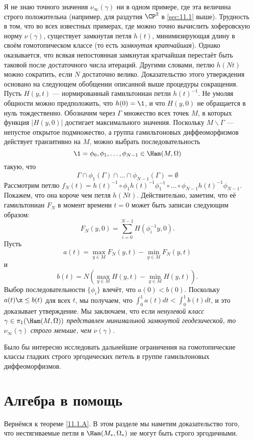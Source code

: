 Я не знаю точного значения $\nu_\infty (\gamma)$ ни в одном примере, где эта величина строго положительна (например, для раздутия $\CP^2$ в \ref{sec:11.1} выше).
Трудность в том, что во всех известных примерах, где можно точно вычислить хоферовскую норму $\nu(\gamma)$, существует замкнутая петля $h(t)$, минимизирующая длину в своём гомотопическом классе (то есть \emph{замкнутая кратчайшая}).
Однако оказывается, что всякая непостоянная замкнутая кратчайшая перестаёт быть таковой после достаточного числа итераций.
Другими словами, петлю $h(Nt)$ можно сократить, если $N$ достаточно велико.
Доказательство этого утверждения основано на следующем обобщении описанной выше процедуры сокращения.
Пусть $H(y, t)$ --- нормированный гамильтониан петли $h(t)^{-1}$.
Не умоляя общности можно предположить, что $h(0) = \1$, и что $H(y,0)$ не обращается в нуль тождественно.
Обозначим через $\Gamma$ множество всех точек $M$, в которых функция $|H(y, 0)|$ достигает максимального значения.
Поскольку $M \backslash \Gamma$ --- непустое открытое подмножество, а группа гамильтоновых диффеоморфизмов действует транзитивно на $M$, можно выбрать последовательность 
\[\1=\phi_0,\phi_1,\dots,\phi_{N-1}\in\Ham(M,\Omega)\]
такую, что 
\[\Gamma\cap\phi_1(\Gamma)\cap\dots\cap\phi_{N-1}(\Gamma)=\emptyset\]
Рассмотрим петлю $f_N(t) = h(t)^{-1} \circ \phi_1h(t)^{-1}\phi_1^{-1} \circ \dots \circ \phi_{N-1}h(t)^{-1}\phi_{N-1}$.
Покажем, что она короче чем петля $h(Nt)$.
Действительно, заметим, что её гамильтониан $F_N$ в момент времени $t = 0$ может быть записан следующим образом:
\[F_N(y,0) = \sum_{i=0}^{N-1} H(\phi_i^{-1}y, 0).\]
Пусть
\[a(t)
=
\max_{y\in M} F_N(y, t) - \min_{y\in M}  F_N(y, t)
\]
и
\[b(t)
=
N(\max_{y\in M} H(y, t) - \min_{y\in M}  H(y, t)).
\]
Выбор последовательности $\{\phi_i\}$ влечёт, что $a(0) < b(0)$.
Поскольку $a(t) \z\le b(t)$ для всех $t$, мы получаем, что $\int_0^1a(t)dt < \int_0^1 b(t)dt$, и это доказывает утверждение.
Мы заключаем, что если \textit{ненулевой класс $\gamma\in \pi_1(\Ham(M, \Omega))$ представлен минимальной замкнутой геодезической, то $\nu_\infty (\gamma)$ строго меньше, чем $\nu(\gamma)$.}

Было бы интересно исследовать дальнейшие ограничения на гомотопические классы гладких строго эргодических петель в группе гамильтоновых диффеоморфизмов.

\section{Алгебра в помощь}

Вернёмся к теореме \ref{11.1.A}.
В этом разделе мы наметим доказательство того, что нестягиваемые петли в $\Ham(M_\ast, \Omega_\ast)$ не могут быть строго эргодичными.

